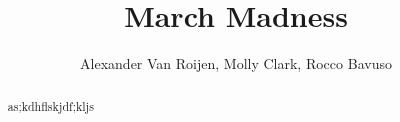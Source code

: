 \documentclass[]{article}
\title{March Madness}
\author{Alexander Van Roijen, Molly Clark, Rocco Bavuso}
\begin{document}
\maketitle

\begin{abstract}
as;kdhflskjdf;kljs
\end{abstract}

\section{}
\end{document}

